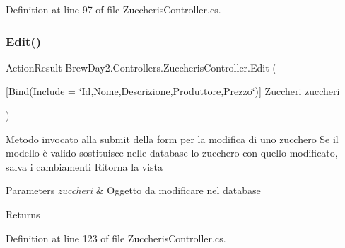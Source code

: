Definition at line 97 of file Zuccheris\+Controller.\+cs.

\mbox{\label{class_brew_day2_1_1_controllers_1_1_zuccheris_controller_a52aadaa2bd2a5f5874efec4d50a0bee9}} 
\subsubsection{\texorpdfstring{Edit()}{Edit()}\hspace{0.1cm}{\footnotesize\ttfamily [2/2]}}
{\footnotesize\ttfamily Action\+Result Brew\+Day2.\+Controllers.\+Zuccheris\+Controller.\+Edit (\begin{DoxyParamCaption}\item[{\mbox{[}\+Bind(\+Include = \char`\"{}\+Id,\+Nome,\+Descrizione,\+Produttore,\+Prezzo\char`\"{})\mbox{]} \mbox{\hyperlink{class_brew_day2_1_1_models_1_1_zuccheri}{Zuccheri}}}]{zuccheri }\end{DoxyParamCaption})}



Metodo invocato alla submit della form per la modifica di uno zucchero Se il modello è valido sostituisce nelle database lo zucchero con quello modificato, salva i cambiamenti Ritorna la vista 


\begin{DoxyParams}{Parameters}
{\em zuccheri} & Oggetto da modificare nel database\\
\hline
\end{DoxyParams}
\begin{DoxyReturn}{Returns}

\end{DoxyReturn}


Definition at line 123 of file Zuccheris\+Controller.\+cs.

\mbox{\label{class_brew_day2_1_1_controllers_1_1_zuccheris_controller_ada1bf34b38c332323dd30dcf18643fb5}} 
